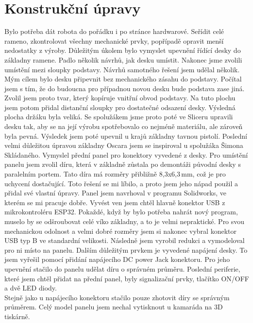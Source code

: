 \section{Konstrukční úpravy}Bylo potřeba dát robota do pořádku i po stránce hardwarové. Seřídit celé rameno, zkontrolovat všechny mechanické prvky, popřípadě opravit menší nedostatky z výroby. Důležitým úkolem bylo vymyslet upevnění řídící desky do základny ramene. Padlo několik návrhů, jak desku umístit. Nakonec jsme zvolili umístění mezi sloupky podstavy. Návrhů samotného řešení jsem udělal několik. Mým cílem bylo desku připevnit bez mechanického zásahu do podstavy. Počítal jsem s tím, že do budoucna pro případnou novou desku bude podstava zase jiná. Zvolil jsem proto tvar, který kopíruje vnitřní obvod podstavy. Na tuto plochu jsem potom přidal distanční sloupky pro dostatečné odsazení desky. Výsledná plocha držáku byla veliká. Se spolužákem jsme proto poté ve Sliceru upravili desku tak, aby se na její výrobu spotřebovalo co nejméně materiálu, ale zároveň byla pevná. Výsledek jsem poté upevnil u krajů základny tavnou pistolí. Poslední velmi důležitou úpravou základny Oscara jsem se inspiroval u spolužáka Šimona Skládaného. Vymyslel přední panel pro konektory vyvedené z desky. Pro umístění panelu jsem zvolil díru, která v základně zůstala po demontáži původní desky s paralelním portem. Tato díra má rozměry přibližně 8,3x6,3\,mm, což je pro uchycení dostačující. Toto řešení se mi líbilo, a proto jsem jeho nápad použil a přidal své vlastní úpravy. Panel jsem navrhoval v programu Solidworks, ve kterém se mi pracuje dobře. Vyvést ven jsem chtěl hlavně konektor USB z mikrokontroléru ESP32. Pokaždé, když by bylo potřeba nahrát nový program, muselo by se odšroubovat celé víko základny, a to je velmi nepraktické. Pro svou mechanickou odolnost a velmi dobré rozměry jsem si nakonec vybral konektor USB typ B ve standardní velikosti. Následně jsem vyrobil redukci a vymodeloval pro ni místo na panelu. Dalším důležitým prvkem je vyvedené napájení desky. To jsem vyřešil pomocí přidání napájecího DC power Jack konektoru. Pro jeho upevnění stačilo do panelu udělat díru o správném průměru. Poslední periferie, které jsem chtěl přidat na přední panel, byly signalizační prvky, tlačítko ON/OFF a dvě LED diody.\\ Stejně jako u napájecího konektoru stačilo pouze zhotovit díry se správným průměrem. Celý model panelu jsem nechal vytisknout u kamaráda na 3D tiskárně.

